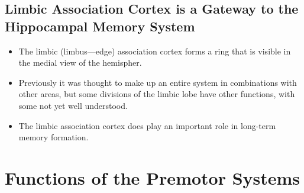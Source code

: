 \documentclass[12pt,a4paper]{article}
\begin{document}
\subsection{Limbic Association Cortex is a Gateway to the Hippocampal Memory System}
\begin{itemize}
    \item The limbic (limbus---edge) association cortex forms a ring that is visible in the medial view of the hemispher.
    \item Previously it was thought to make up an entire system in combinations with other areas, but some divisions of the limbic lobe have other functions, with some not yet well understood.
    \item The limbic association cortex does play an important role in long-term memory formation.
\end{itemize}


\clearpage
\section{Functions of the Premotor Systems}
\end{document}
